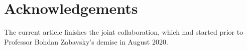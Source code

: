 \documentclass[12pt,a4paper, reqno]{amsart}
\def\GL{\rm GL}
\begin{document}

\section*{Acknowledgements}
The current  article finishes the joint collaboration,
which had started prior to Professor Bohdan  Zabavsky's demise in August 2020.


\newpage
\end{document}
